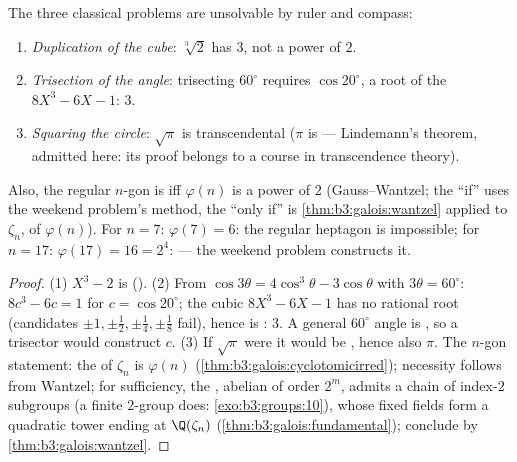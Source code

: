 \begin{corollary}\label{cor:b3:galois:impossible}
The three classical problems are unsolvable by ruler and
compass:
\begin{enumerate}
  \item \emph{Duplication of the cube}: $\sqrt[3]2$ has 
        $3$, not a power of $2$.
  \item \emph{Trisection of the angle}: trisecting $60^\circ$
        requires $\cos 20^\circ$, a root of the  $8X^3
        - 6X - 1$:  $3$.
  \item \emph{Squaring the circle}: $\sqrt\pi$ is transcendental
        ($\pi$ is --- Lindemann's theorem, admitted here: its
        proof belongs to a course in transcendence theory).
\end{enumerate}
Also, the regular $n$-gon is  iff
$\varphi(n)$ is a power of $2$ (Gauss--Wantzel; the ``if'' uses
the weekend problem's method, the ``only if'' is
\cref{thm:b3:galois:wantzel} applied to $\zeta_n$, of 
$\varphi(n)$). For $n = 7$: $\varphi(7) = 6$: the regular
heptagon is impossible; for $n = 17$: $\varphi(17) = 16 = 2^4$:
 --- the weekend problem constructs it.
\end{corollary}

\begin{proof}
(1) $X^3 - 2$ is  (). (2) From $\cos
3\theta = 4\cos^3\theta - 3\cos\theta$ with $3\theta =
60^\circ$: $8c^3 - 6c = 1$ for $c = \cos 20^\circ$; the cubic
$8X^3 - 6X - 1$ has no rational root (candidates $\pm1, \pm\frac
12, \pm\frac14, \pm\frac18$ fail), hence is : 
$3$. A general $60^\circ$ angle is , so a trisector
would construct $c$. (3) If $\sqrt\pi$ were  it
would be , hence also $\pi$. The $n$-gon statement: the
 of $\zeta_n$ is $\varphi(n)$
(\cref{thm:b3:galois:cyclotomicirred}); necessity follows from
Wantzel; for sufficiency, the , abelian of order
$2^m$, admits a chain of index-$2$ subgroups (a finite $2$-group
does: \cref{exo:b3:groups:10}), whose fixed fields form a
quadratic tower ending at $\Q(\zeta_n)$
(\cref{thm:b3:galois:fundamental}); conclude by
\cref{thm:b3:galois:wantzel}.
\end{proof}

